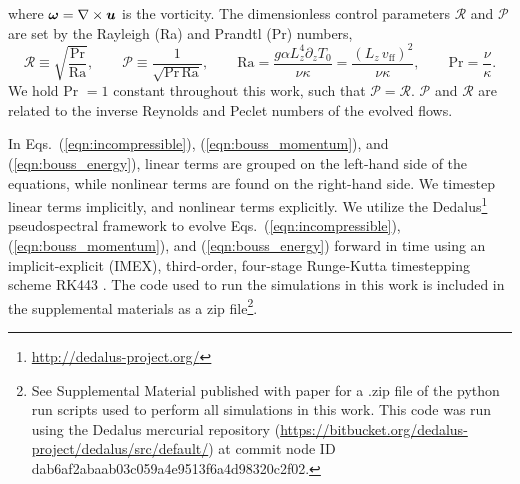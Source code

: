 where $\bm{\omega} = \nabla \times \bm{u}$ is the vorticity.
The dimensionless control parameters $\mathcal{R}$ and $\mathcal{P}$ are set by the Rayleigh (Ra) and Prandtl (Pr) numbers,
\begin{equation}
\mathcal{R} \equiv \sqrt{\frac{\text{Pr}}{\text{Ra}}}, \qquad \mathcal{P} \equiv \frac{1}{\sqrt{\text{Pr}\,\text{Ra}}}, \qquad
\text{Ra} = \frac{g \alpha L_z^4 \partial_z T_0}{\nu\kappa} = \frac{(L_z\,v_{\text{ff}})^2}{\nu\kappa}, \qquad \text{Pr} = \frac{\nu}{\kappa}.
\end{equation}
We hold Pr $= 1$ constant throughout this work, such that $\mathcal{P} = \mathcal{R}$.
$\mathcal{P}$ and $\mathcal{R}$ are related to the inverse Reynolds and Peclet numbers of the evolved flows.

In Eqs.~(\ref{eqn:incompressible}), (\ref{eqn:bouss_momentum}), and (\ref{eqn:bouss_energy}), linear terms are grouped on the left-hand side of the equations, while nonlinear terms are found on the right-hand side. We timestep linear terms implicitly, and nonlinear terms explicitly.
We utilize the Dedalus\footnote{\url{http://dedalus-project.org/}} pseudospectral framework \cite{burns&all2016} to evolve Eqs.~(\ref{eqn:incompressible}), (\ref{eqn:bouss_momentum}), and (\ref{eqn:bouss_energy}) forward in time using an implicit-explicit (IMEX), third-order, four-stage Runge-Kutta timestepping scheme RK443 \cite{ascher&all1997}. 
The code used to run the simulations in this work is included in the supplemental materials as a zip file\footnote{See Supplemental Material published with paper for a .zip file of the python run scripts used to perform all simulations in this work. This code was run using the Dedalus mercurial repository (\url{https://bitbucket.org/dedalus-project/dedalus/src/default/}) at commit node ID dab6af2abaab03c059a4e9513f6a4d98320c2f02.}.

